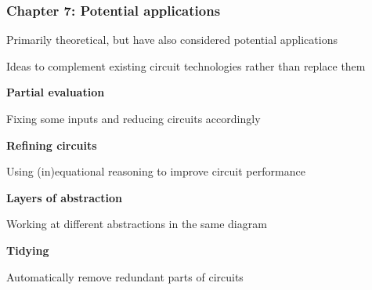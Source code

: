 \begin{frame}
    \frametitle{Chapter 7: Potential applications}

    Primarily \alert{theoretical}, but have also considered potential
    \alert{applications}

    Ideas to \alert{complement} existing circuit technologies rather than
    \alert{replace} them

    \large
    \vspace{0.5em}

    \pause

    \begin{center}
        \begin{minipage}{0.45\textwidth}
            \textbf{Partial evaluation}
            \centering

            \vspace{0.25em}

            Fixing some inputs and reducing circuits accordingly

        \end{minipage}
        \quad\pause
        \begin{minipage}{0.45\textwidth}
            \centering
            \textbf{Refining circuits}

            \vspace{0.25em}

            Using (in)equational reasoning to improve circuit performance
        \end{minipage}

        \pause
        \vspace{1em}

        \begin{minipage}{0.45\textwidth}
            \centering
            \textbf{Layers of abstraction}

            \vspace{0.25em}

            Working at different abstractions in the same diagram
        \end{minipage}
        \quad\pause
        \begin{minipage}{0.45\textwidth}
            \centering
            \textbf{Tidying}

            \vspace{0.25em}

            Automatically remove redundant parts of circuits

        \end{minipage}
    \end{center}

\end{frame}

